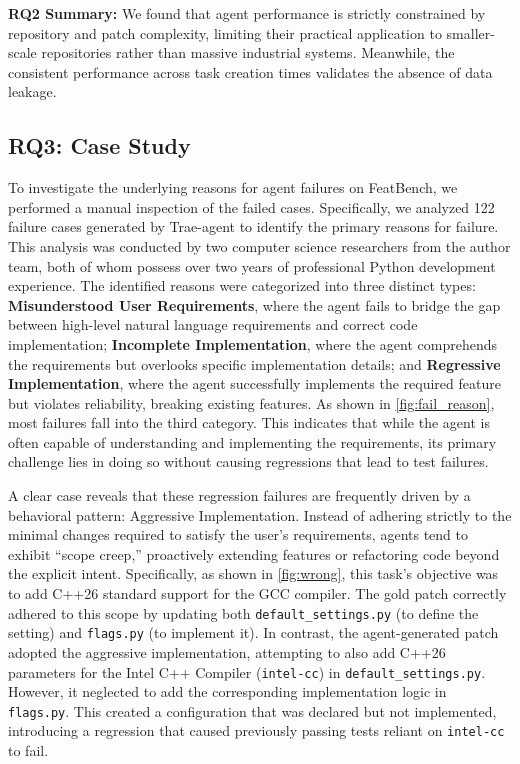 \begin{boxK}
\textbf{RQ2 Summary:} 
We found that agent performance is strictly constrained by repository and patch complexity, limiting their practical application to smaller-scale repositories rather than massive industrial systems. Meanwhile, the consistent performance across task creation times validates the absence of data leakage.
\end{boxK}

\subsection{RQ3: Case Study}
To investigate the underlying reasons for agent failures on FeatBench, we performed a manual inspection of the failed cases. Specifically, we analyzed 122 failure cases generated by Trae-agent to identify the primary reasons for failure. This analysis was conducted by two computer science researchers from the author team, both of whom possess over two years of professional Python development experience. The identified reasons were categorized into three distinct types:
 \textbf{Misunderstood User Requirements}, where the agent fails to bridge the gap between high-level natural language requirements and correct code implementation;  \textbf{Incomplete Implementation}, where the agent comprehends the requirements but overlooks specific implementation details; and  \textbf{Regressive Implementation}, where the agent successfully implements the required feature but violates reliability, breaking existing features. As shown in \cref{fig:fail_reason}, most failures fall into the third category.
This indicates that while the agent is often capable of understanding and implementing the requirements, its primary challenge lies in doing so without causing regressions that lead to test failures.



A clear case reveals that these regression failures are frequently driven by a behavioral pattern: Aggressive Implementation. Instead of adhering strictly to the minimal changes required to satisfy the user's requirements, agents tend to exhibit ``scope creep,'' proactively extending features or refactoring code beyond the explicit intent.
Specifically, as shown in \cref{fig:wrong}, this task's objective was to add C++26 standard support for the GCC compiler.
The gold patch correctly adhered to this scope by updating both \texttt{default\_settings.py} (to define the setting) and \texttt{flags.py} (to implement it).
In contrast, the agent-generated patch adopted the aggressive implementation, attempting to also add C++26 parameters for the Intel C++ Compiler (\texttt{intel-cc}) in \texttt{default\_settings.py}.
However, it neglected to add the corresponding implementation logic in \texttt{flags.py}. This created a configuration that was declared but not implemented, introducing a regression that caused previously passing tests reliant on \texttt{intel-cc} to fail.


